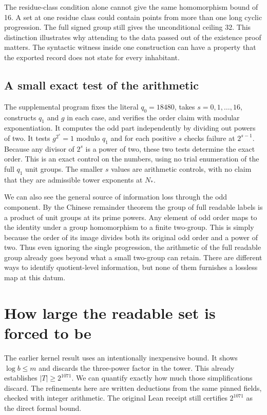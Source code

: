 \documentclass[12pt,letterpaper]{article}
\begin{document}
The residue-class condition alone cannot give the same homomorphism bound of 16. A set at one residue class could contain points from more than one long cyclic progression. The full signed group still gives the unconditional ceiling 32. This distinction illustrates why attending to the data passed out of the existence proof matters. The syntactic witness inside one construction can have a property that the exported record does not state for every inhabitant.

\subsection{A small exact test of the arithmetic}
The supplemental program fixes the literal $q_0=18480$, takes $s=0,1,\ldots,16$, constructs $q_1$ and $g$ in each case, and verifies the order claim with modular exponentiation. It computes the odd part independently by dividing out powers of two. It tests $g^{2^s}=1$ modulo $q_1$ and for each positive $s$ checks failure at $2^{s-1}$. Because any divisor of $2^s$ is a power of two, these two tests determine the exact order. This is an exact control on the numbers, using no trial enumeration of the full $q_1$ unit groups. The smaller $s$ values are arithmetic controls, with no claim that they are admissible tower exponents at $N_*$.

We can also see the general source of information loss through the odd component. By the Chinese remainder theorem the group of full readable labels is a product of unit groups at its prime powers. Any element of odd order maps to the identity under a group homomorphism to a finite two-group. This is simply because the order of its image divides both its original odd order and a power of two. Thus even ignoring the single progression, the arithmetic of the full readable group already goes beyond what a small two-group can retain. There are different ways to identify quotient-level information, but none of them furnishes a lossless map at this datum.


\section{How large the readable set is forced to be}\label{sec:lower}
The earlier kernel result uses an intentionally inexpensive bound. It shows $\log b\le m$ and discards the three-power factor in the tower. This already establishes $|T|\ge2^{1071}$. We can quantify exactly how much those simplifications discard. The refinements here are written deductions from the same pinned fields, checked with integer arithmetic. The original Lean receipt still certifies $2^{1071}$ as the direct formal bound.
\end{document}
